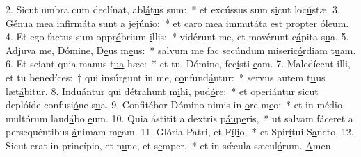 2. Sicut umbra cum declínat, abl\uline{á}t\uline{u}s sum:~* et excússus sum s\uline{i}cut loc\uline{ú}stæ.
3. Génua mea infirmáta sunt a jej\uline{ú}n\uline{i}o:~* et caro mea immutáta est pr\uline{o}pter \uline{ó}leum.
4. Et ego factus sum oppr\uline{ó}brium \uline{i}llis:~* vidérunt me, et movérunt c\uline{á}pita s\uline{u}a.
5. Adjuva me, Dómine, D\uline{e}us m\uline{e}us:~* salvum me fac secúndum miseric\uline{ó}rdiam t\uline{u}am.
6. Et sciant quia manus t\uline{u}\uline{a} hæc:~* et tu, Dómine, fec\uline{í}sti \uline{e}am.
7. Maledícent illi, et tu benedíces:~† qui insúrgunt in me, c\uline{o}nfund\uline{á}ntur:~* servus autem t\uline{u}us læt\uline{á}bitur.
8. Induántur qui détrahunt m\uline{i}hi, pud\uline{ó}re:~* et operiántur sicut deplóide confusi\uline{ó}ne s\uline{u}a.
9. Confitébor Dómino nimis in \uline{o}re m\uline{e}o:~* et in médio multórum laud\uline{á}bo \uline{e}um.
10. Quia ástitit a dextris p\uline{áu}p\uline{e}ris,~* ut salvam fáceret a persequéntibus \uline{á}nimam m\uline{e}am.
11. Glória Patri, et F\uline{í}l\uline{i}o,~* et Spir\uline{í}tui S\uline{a}ncto.
12. Sicut erat in princípio, et n\uline{u}nc, et s\uline{e}mper,~* et in sǽcula sæcul\uline{ó}rum. \uline{A}men.

